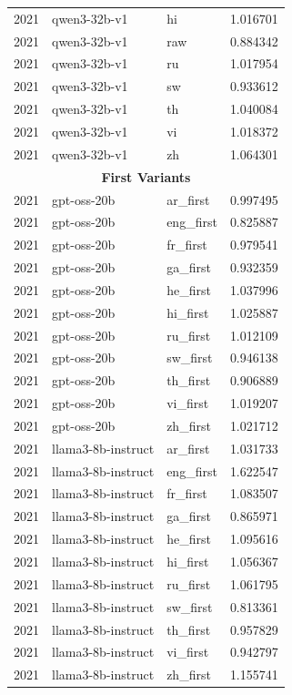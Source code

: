 \begin{tabular}{lllr}
2021 & qwen3-32b-v1 & hi & 1.016701 \\
2021 & qwen3-32b-v1 & raw & 0.884342 \\
2021 & qwen3-32b-v1 & ru & 1.017954 \\
2021 & qwen3-32b-v1 & sw & 0.933612 \\
2021 & qwen3-32b-v1 & th & 1.040084 \\
2021 & qwen3-32b-v1 & vi & 1.018372 \\
2021 & qwen3-32b-v1 & zh & 1.064301 \\
\midrule
\multicolumn{4}{c}{\textbf{First Variants}} \\
\midrule
2021 & gpt-oss-20b & ar\_first & 0.997495 \\
2021 & gpt-oss-20b & eng\_first & 0.825887 \\
2021 & gpt-oss-20b & fr\_first & 0.979541 \\
2021 & gpt-oss-20b & ga\_first & 0.932359 \\
2021 & gpt-oss-20b & he\_first & 1.037996 \\
2021 & gpt-oss-20b & hi\_first & 1.025887 \\
2021 & gpt-oss-20b & ru\_first & 1.012109 \\
2021 & gpt-oss-20b & sw\_first & 0.946138 \\
2021 & gpt-oss-20b & th\_first & 0.906889 \\
2021 & gpt-oss-20b & vi\_first & 1.019207 \\
2021 & gpt-oss-20b & zh\_first & 1.021712 \\
2021 & llama3-8b-instruct & ar\_first & 1.031733 \\
2021 & llama3-8b-instruct & eng\_first & 1.622547 \\
2021 & llama3-8b-instruct & fr\_first & 1.083507 \\
2021 & llama3-8b-instruct & ga\_first & 0.865971 \\
2021 & llama3-8b-instruct & he\_first & 1.095616 \\
2021 & llama3-8b-instruct & hi\_first & 1.056367 \\
2021 & llama3-8b-instruct & ru\_first & 1.061795 \\
2021 & llama3-8b-instruct & sw\_first & 0.813361 \\
2021 & llama3-8b-instruct & th\_first & 0.957829 \\
2021 & llama3-8b-instruct & vi\_first & 0.942797 \\
2021 & llama3-8b-instruct & zh\_first & 1.155741 \\

\end{tabular}
